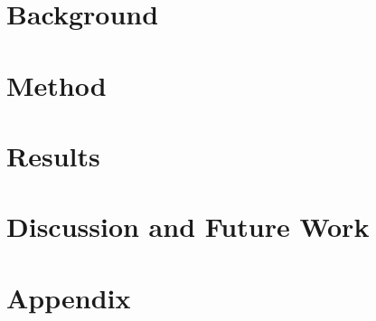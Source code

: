 \documentclass[10pt,letterpaper]{article}
\begin{document}




\iffalse
\section*{P1}



\fi

\section{Background}








\section{Method}





\section{Results}



\section{Discussion and Future Work}










\setlength{\bibleftmargin}{.125in}
\setlength{\bibindent}{-\bibleftmargin}



\newpage
\onecolumn
\section*{Appendix}




\end{document}
